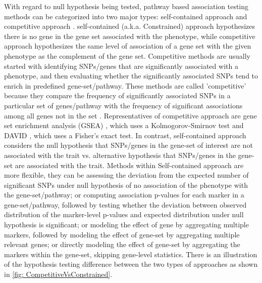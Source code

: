 \documentclass[12pt]{article}
\begin{document}
With regard to null hypothesis being tested, pathway based association testing methods can be categorized into two major types: self-contained approach and competitive approach \cite{Goeman2007,Liu2007,Nam2008,Wang2010,Fridley2010,Fridley2011}. self-contained (a.k.a. Constrained) approach hypothesizes there is no gene in the gene set associated with the phenotype, while competitive approach hypothesizes the same level of association of a gene set with the given phenotype as the complement of the gene set. Competitive methods are usually started with identifying SNPs/genes that are significantly associated with a phenotype, and then evaluating whether the significantly associated SNPs tend to enrich in predefined gene-set/pathway. These methods are called 'competitive' because they compare the frequency of significantly associated SNPs in a particular set of genes/pathway with the frequency of significant associations among all genes not in the set \cite{Fridley2011}. Representatives of competitive approach are gene set enrichment analysis (GSEA) \cite{Subramanian2005}, which uses a Kolmogorov-Smirnov test and DAVID \cite{DennisJr2003}, which uses a Fisher's exact test. In contrast, self-contained approach considers the null hypothesis that SNPs/genes in the gene-set of interest are not associated with the trait vs. alternative hypothesis that SNPs/genes in the gene-set are associated with the trait. Methods within Self-contained approach are more flexible, they can be assessing the deviation from the expected number of significant SNPs under null hypothesis of no association of the phenotype with the gene-set/pathway; or computing association p-values for each marker in a gene-set/pathway, followed by testing whether the deviation between observed distribution of the marker-level p-values and expected distribution under null hypothesis is significant; or modeling the effect of gene by aggregating multiple markers, followed by modeling the effect of gene-set by aggregating multiple relevant genes; or directly modeling the effect of gene-set by aggregating the markers within the gene-set, skipping gene-level statistics. There is an illustration of the hypothesis testing difference between the two types of approaches as shown in \ref{fig: CompetitiveVsConstrained}.
\end{document}

